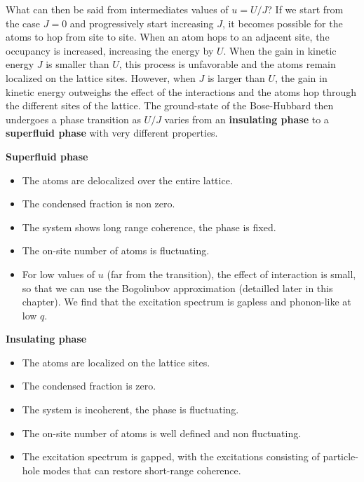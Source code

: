 What can then be said from intermediates values of $u=U/J$? If we start from the case $J=0$ and progressively start increasing $J$, it becomes possible for the atoms to hop from site to site. When an atom hops to an adjacent site, the occupancy is increased, increasing the energy by $U$. When the gain in kinetic energy $J$ is smaller than $U$, this process is unfavorable and the atoms remain localized on the lattice sites. However, when $J$ is larger than $U$, the gain in kinetic energy outweighs the effect of the interactions and the atoms hop through the different sites of the lattice. The ground-state of the Bose-Hubbard then undergoes a phase transition as $U/J$ varies from an \textbf{insulating phase} to a \textbf{superfluid phase} with very different properties.

\begin{minipage}[t]{0.45\textwidth}
    \noindent \textbf{Superfluid phase}
    \begin{itemize}
        \item The atoms are delocalized over the entire lattice.
        \item The condensed fraction is non zero.
        \item The system shows long range coherence, \ie the phase is fixed.
        \item The on-site number of atoms is fluctuating.
        \item For low values of $u$ (far from the transition), the effect of interaction is small, so that we can use the Bogoliubov approximation (detailled later in this chapter). We find that the excitation spectrum is gapless and phonon-like at low $q$.
    \end{itemize}
\end{minipage}
\begin{minipage}[t]{0.48\textwidth}
    \noindent \textbf{Insulating phase}
    \begin{itemize}
        \item The atoms are localized on the lattice sites.
        \item The condensed fraction is zero.
        \item The system is incoherent, the phase is fluctuating.
        \item The on-site number of atoms is well defined and non fluctuating.
        \item The excitation spectrum is gapped, with the excitations consisting of particle-hole modes that can restore short-range coherence. 
    \end{itemize}
\end{minipage}

